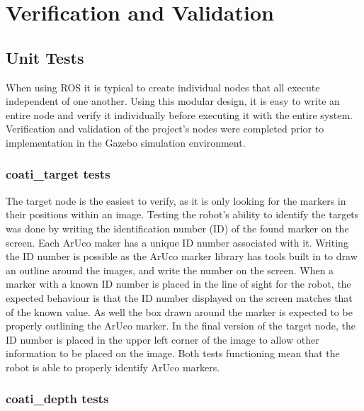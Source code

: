 \documentclass{article}[12]
\begin{document}
\section{Verification and Validation} 
	
		\subsection{Unit Tests}
	
	When using ROS it is typical to create individual nodes that all execute independent of one another. Using this modular design, it is easy to write an entire node and verify it individually before executing it with the entire system. Verification and validation of the project's nodes were completed prior to implementation in the Gazebo simulation environment.
	
	\subsubsection{coati\_target tests}
	
	The target node is the easiest to verify, as it is only looking for the markers in their positions within an image. Testing the robot's ability to identify the targets was done by writing the identification number (ID) of the found marker on the screen. Each ArUco maker has a unique ID number associated with it. Writing the ID number is possible as the ArUco marker library has tools built in to draw an outline around the images, and write the number on the screen. 
When a marker with a known ID number is placed in the line of sight for the robot, the expected behaviour is that the ID number displayed on the screen matches that of the known value. As well the box drawn around the marker is expected to be properly outlining the ArUco marker. In the final version of the target node, the ID number is placed in the upper left corner of the image to allow other information to be placed on the image. Both tests functioning mean that the robot is able to properly identify ArUco markers. 
	
	\subsubsection{coati\_depth tests}
	
\end{document}
